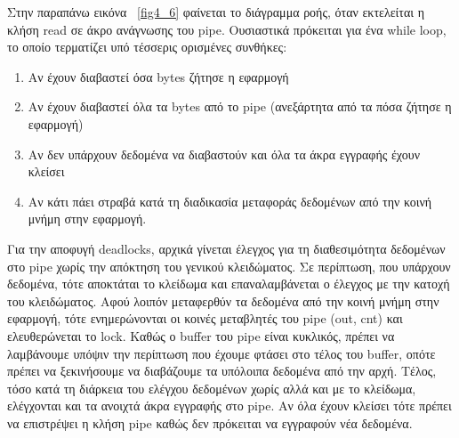 Στην παραπάνω εικόνα ~\ref{fig4_6} φαίνεται το διάγραμμα ροής, όταν εκτελείται η
κλήση read σε άκρο ανάγνωσης του pipe. Ουσιαστικά πρόκειται για ένα while loop,
το οποίο τερματίζει υπό τέσσερις ορισμένες συνθήκες:
\begin{enumerate}
	\item Αν έχουν διαβαστεί όσα bytes ζήτησε η εφαρμογή
	\item Αν έχουν διαβαστεί όλα τα bytes από το pipe (ανεξάρτητα από τα
		πόσα ζήτησε η εφαρμογή) 
	\item Αν δεν υπάρχουν δεδομένα να διαβαστούν και όλα τα άκρα εγγραφής
		έχουν κλείσει
	\item Αν κάτι πάει στραβά κατά τη διαδικασία μεταφοράς δεδομένων από την
		κοινή μνήμη στην εφαρμογή.
\end{enumerate}
Για την αποφυγή deadlocks, αρχικά γίνεται έλεγχος για τη διαθεσιμότητα δεδομένων
στο pipe χωρίς την απόκτηση του γενικού κλειδώματος. Σε περίπτωση, που υπάρχουν
δεδομένα, τότε αποκτάται το κλείδωμα και επαναλαμβάνεται ο έλεγχος με την κατοχή
του κλειδώματος. Αφού λοιπόν μεταφερθύν τα δεδομένα από την κοινή μνήμη στην
εφαρμογή, τότε ενημερώνονται οι κοινές μεταβλητές του pipe (out, cnt) και
ελευθερώνεται το lock. Καθώς ο buffer του pipe είναι κυκλικός, πρέπει να
λαμβάνουμε υπόψιν την περίπτωση που έχουμε φτάσει στο τέλος του buffer, οπότε
πρέπει να ξεκινήσουμε να διαβάζουμε τα υπόλοιπα δεδομένα από την αρχή. Τέλος,
τόσο κατά τη διάρκεια του ελέγχου δεδομένων χωρίς αλλά και με το κλείδωμα,
ελέγχονται και τα ανοιχτά άκρα εγγραφής στο pipe. Αν όλα έχουν κλείσει τότε
πρέπει να επιστρέψει η κλήση pipe καθώς δεν πρόκειται να εγγραφούν νέα δεδομένα.

